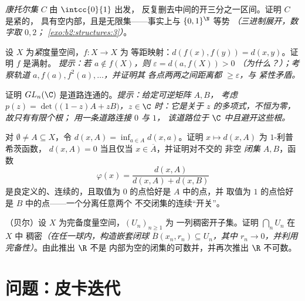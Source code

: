 \begin{exercise}[$\star\star$]\label{exo:b2:metric:8}
\emph{康托尔集} $C$ 由 $\intcc{0}{1}$ 出发，
反复删去中间的开三分之一区间。证明 $C$ 是紧的，
具有空内部，且是无限集——事实上与
$\{0,1\}^{\N}$ 等势 \emph{（三进制展开，数字取 $0,2$；
\cref{exo:b2:structures:3}）}。
\end{exercise}

\begin{exercise}[$\star\star\star$]\label{exo:b2:metric:9}
设 $X$ 为\emph{紧}度量空间，$f \colon X \to X$ 为
等距映射：$d(f(x), f(y)) = d(x, y)$。证明 $f$ 是满射。
\emph{提示：若 $a \notin f(X)$，则 $\varepsilon = d(a, f(X)) > 0$
（为什么？）；考察轨道 $a, f(a), f^2(a), \dots$，并证明其
各点两两之间距离都 $\geq \varepsilon$，与
紧性矛盾。}
\end{exercise}

\begin{exercise}[$\star\star\star$]\label{exo:b2:metric:10}
证明 $GL_n(\C)$ 是道路连通的。\emph{提示：给定可逆矩阵 $A, B$，
考虑 $p(z) = \det\bigl((1 - z)A + zB\bigr)$，$z
\in \C$ 时：它是关于 $z$ 的多项式，不恒为零，故只有有限个根；
用一条道路连接 $0$ 与 $1$，
该道路位于 $\C$ 中且避开这些根。}
\end{exercise}

\begin{exercise}[$\star\star$]\label{exo:b2:metric:11}
对 $\emptyset \neq A \subseteq X$，令 $d(x, A) = \inf_{a \in A}
d(x, a)$。证明 $x \mapsto d(x, A)$ 为 $1$-利普希茨函数，
$d(x, A) = 0$ 当且仅当 $x \in \overline A$，并证明对不交的
非空 \emph{闭集} $A, B$，函数
\[
\varphi(x) = \frac{d(x, A)}{d(x, A) + d(x, B)}
\]
是良定义的、连续的，且取值为 $0$ 的点恰好是 $A$ 中的点，并
取值为 $1$ 的点恰好是 $B$ 中的点——一个分离任意两个
不交闭集的连续“开关”。
\end{exercise}

\begin{exercise}[$\star\star\star$]\label{exo:b2:metric:12}
（贝尔）设 $X$ 为完备度量空间，$(U_n)_{n\geq1}$ 为
一列稠密开子集。证明 $\bigcap_n U_n$ 在 $X$ 中
稠密\emph{（在任一球内，构造嵌套闭球
$\overline B(x_n, r_n) \subseteq U_n$，其中 $r_n \to 0$，并利用
完备性）}。由此推出 $\R$ 不是
内部为空的闭集的可数并，并再次推出
$\R$ 不可数。
\end{exercise}

\section{问题：皮卡迭代}

